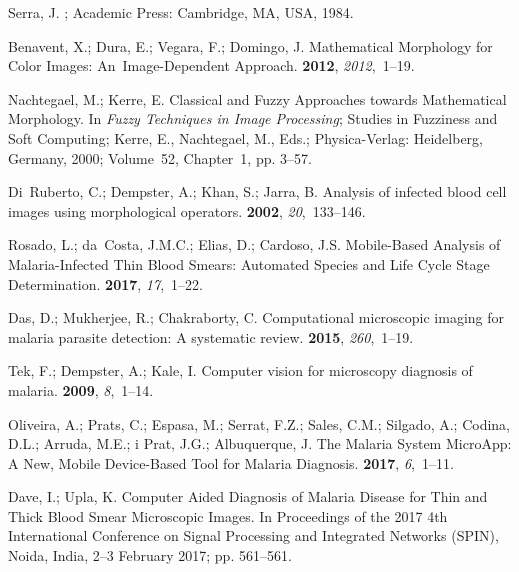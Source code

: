 \documentclass[sensors,review,accept,moreauthors,pdftex,10pt,a4paper]{mdpi}
\begin{document}
\begin{thebibliography}{999}
Serra, J.
; Academic Press: Cambridge, MA, USA,
  1984.

Benavent, X.; Dura, E.; Vegara, F.; Domingo, J.
\newblock Mathematical Morphology for Color Images: An~Image-Dependent
  Approach.
 {\bf 2012}, {\em 2012},~1--19.

Nachtegael, M.; Kerre, E. Classical and Fuzzy Approaches towards Mathematical
  Morphology.
\newblock In {\em Fuzzy Techniques in Image Processing}; Studies in Fuzziness and
  Soft Computing; Kerre, E., Nachtegael,
  M., Eds.; Physica-Verlag: Heidelberg,  Germany, 2000; Volume~52, Chapter~1, pp. 3--57.

Di~Ruberto, C.; Dempster, A.; Khan, S.; Jarra, B.
\newblock Analysis of infected blood cell images using morphological operators.
 {\bf 2002}, {\em 20},~133--146.

Rosado, L.; da~Costa, J.M.C.; Elias, D.; Cardoso, J.S.
\newblock Mobile-Based Analysis of Malaria-Infected Thin Blood Smears:
  Automated Species and Life Cycle Stage Determination.
 {\bf 2017}, {\em 17},~1--22.

Das, D.; Mukherjee, R.; Chakraborty, C.
\newblock Computational microscopic imaging for malaria parasite detection: A
  systematic review.
 {\bf 2015}, {\em 260},~1--19.

Tek, F.; Dempster, A.; Kale, I.
\newblock Computer vision for microscopy diagnosis of malaria.
 {\bf 2009}, {\em 8},~1--14.

Oliveira, A.; Prats, C.; Espasa, M.; Serrat, F.Z.; Sales, C.M.; Silgado, A.; Codina, D.L.; Arruda, M.E.; i Prat, J.G.; Albuquerque, J.
\newblock The Malaria System MicroApp: A New, Mobile Device-Based Tool for
  Malaria Diagnosis.
 {\bf 2017}, {\em 6},~1--11.

Dave, I.; Upla, K.
\newblock Computer Aided Diagnosis of Malaria Disease for Thin and Thick Blood
  Smear Microscopic Images.
\newblock  In Proceedings of the 2017 4th International Conference on Signal
  Processing and Integrated Networks (SPIN), Noida, India, 2--3 February 2017; pp. 561--561.


\end{thebibliography}
\end{document}
